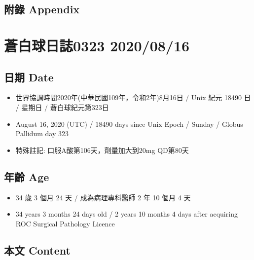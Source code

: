 \documentclass[a5paper, 11pt
]{book}
\providecommand{\tightlist}{%
  \setlength{\itemsep}{0pt}\setlength{\parskip}{0pt}}
\begin{document}
\hypertarget{ux9644ux9304-appendix-75}{%
\subsection{附錄 Appendix}\label{ux9644ux9304-appendix-75}}

\hypertarget{ux84bcux767dux7403ux65e5ux8a8c0323-20200816}{%
\section{蒼白球日誌0323
2020/08/16}\label{ux84bcux767dux7403ux65e5ux8a8c0323-20200816}}

\hypertarget{ux65e5ux671f-date-76}{%
\subsection{日期 Date}\label{ux65e5ux671f-date-76}}

\begin{itemize}
\tightlist
\item
  世界協調時間2020年(中華民國109年，令和2年)8月16日 / Unix 紀元 18490 日
  / 星期日 / 蒼白球紀元第323日
\item
  August 16, 2020 (UTC) / 18490 days since Unix Epoch / Sunday / Globus
  Pallidum day 323
\item
  特殊註記: 口服A酸第106天，劑量加大到20mg QD第80天
\end{itemize}

\hypertarget{ux5e74ux9f61-age-76}{%
\subsection{年齡 Age}\label{ux5e74ux9f61-age-76}}

\begin{itemize}
\tightlist
\item
  34 歲 3 個月 24 天 / 成為病理專科醫師 2 年 10 個月 4 天
\item
  34 years 3 months 24 days old / 2 years 10 months 4 days after
  acquiring ROC Surgical Pathology Licence
\end{itemize}

\hypertarget{ux672cux6587-content-76}{%
\subsection{本文 Content}\label{ux672cux6587-content-76}}
\end{document}
